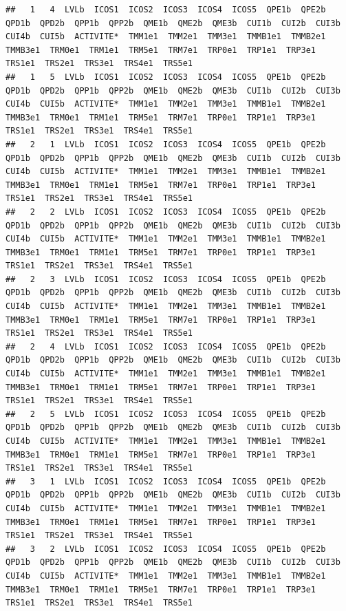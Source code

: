 \documentclass[11pt,a4paper, x11names]{article}\usepackage[]{graphicx}\usepackage[]{color}
\makeatletter
\newenvironment{kframe}{%
 \def\at@end@of@kframe{}%
 \ifinner\ifhmode%
  \def\at@end@of@kframe{\end{minipage}}%
  \begin{minipage}{\columnwidth}%
 \fi\fi%
 \def\FrameCommand##1{\hskip\@totalleftmargin \hskip-\fboxsep
 \colorbox{shadecolor}{##1}\hskip-\fboxsep
     \hskip-\linewidth \hskip-\@totalleftmargin \hskip\columnwidth}%
 \MakeFramed {\advance\hsize-\width
   \@totalleftmargin\z@ \linewidth\hsize
   \@setminipage}}%
 {\par\unskip\endMakeFramed%
 \at@end@of@kframe}
\newenvironment{knitrout}{}{} %
\makeatother
\begin{document}
\begin{knitrout}
\begin{kframe}
\begin{verbatim}
##   1   4  LVLb  ICOS1  ICOS2  ICOS3  ICOS4  ICOS5  QPE1b  QPE2b  QPD1b  QPD2b  QPP1b  QPP2b  QME1b  QME2b  QME3b  CUI1b  CUI2b  CUI3b  CUI4b  CUI5b  ACTIVITE*  TMM1e1  TMM2e1  TMM3e1  TMMB1e1  TMMB2e1  TMMB3e1  TRM0e1  TRM1e1  TRM5e1  TRM7e1  TRP0e1  TRP1e1  TRP3e1  TRS1e1  TRS2e1  TRS3e1  TRS4e1  TRS5e1
##   1   5  LVLb  ICOS1  ICOS2  ICOS3  ICOS4  ICOS5  QPE1b  QPE2b  QPD1b  QPD2b  QPP1b  QPP2b  QME1b  QME2b  QME3b  CUI1b  CUI2b  CUI3b  CUI4b  CUI5b  ACTIVITE*  TMM1e1  TMM2e1  TMM3e1  TMMB1e1  TMMB2e1  TMMB3e1  TRM0e1  TRM1e1  TRM5e1  TRM7e1  TRP0e1  TRP1e1  TRP3e1  TRS1e1  TRS2e1  TRS3e1  TRS4e1  TRS5e1
##   2   1  LVLb  ICOS1  ICOS2  ICOS3  ICOS4  ICOS5  QPE1b  QPE2b  QPD1b  QPD2b  QPP1b  QPP2b  QME1b  QME2b  QME3b  CUI1b  CUI2b  CUI3b  CUI4b  CUI5b  ACTIVITE*  TMM1e1  TMM2e1  TMM3e1  TMMB1e1  TMMB2e1  TMMB3e1  TRM0e1  TRM1e1  TRM5e1  TRM7e1  TRP0e1  TRP1e1  TRP3e1  TRS1e1  TRS2e1  TRS3e1  TRS4e1  TRS5e1
##   2   2  LVLb  ICOS1  ICOS2  ICOS3  ICOS4  ICOS5  QPE1b  QPE2b  QPD1b  QPD2b  QPP1b  QPP2b  QME1b  QME2b  QME3b  CUI1b  CUI2b  CUI3b  CUI4b  CUI5b  ACTIVITE*  TMM1e1  TMM2e1  TMM3e1  TMMB1e1  TMMB2e1  TMMB3e1  TRM0e1  TRM1e1  TRM5e1  TRM7e1  TRP0e1  TRP1e1  TRP3e1  TRS1e1  TRS2e1  TRS3e1  TRS4e1  TRS5e1
##   2   3  LVLb  ICOS1  ICOS2  ICOS3  ICOS4  ICOS5  QPE1b  QPE2b  QPD1b  QPD2b  QPP1b  QPP2b  QME1b  QME2b  QME3b  CUI1b  CUI2b  CUI3b  CUI4b  CUI5b  ACTIVITE*  TMM1e1  TMM2e1  TMM3e1  TMMB1e1  TMMB2e1  TMMB3e1  TRM0e1  TRM1e1  TRM5e1  TRM7e1  TRP0e1  TRP1e1  TRP3e1  TRS1e1  TRS2e1  TRS3e1  TRS4e1  TRS5e1
##   2   4  LVLb  ICOS1  ICOS2  ICOS3  ICOS4  ICOS5  QPE1b  QPE2b  QPD1b  QPD2b  QPP1b  QPP2b  QME1b  QME2b  QME3b  CUI1b  CUI2b  CUI3b  CUI4b  CUI5b  ACTIVITE*  TMM1e1  TMM2e1  TMM3e1  TMMB1e1  TMMB2e1  TMMB3e1  TRM0e1  TRM1e1  TRM5e1  TRM7e1  TRP0e1  TRP1e1  TRP3e1  TRS1e1  TRS2e1  TRS3e1  TRS4e1  TRS5e1
##   2   5  LVLb  ICOS1  ICOS2  ICOS3  ICOS4  ICOS5  QPE1b  QPE2b  QPD1b  QPD2b  QPP1b  QPP2b  QME1b  QME2b  QME3b  CUI1b  CUI2b  CUI3b  CUI4b  CUI5b  ACTIVITE*  TMM1e1  TMM2e1  TMM3e1  TMMB1e1  TMMB2e1  TMMB3e1  TRM0e1  TRM1e1  TRM5e1  TRM7e1  TRP0e1  TRP1e1  TRP3e1  TRS1e1  TRS2e1  TRS3e1  TRS4e1  TRS5e1
##   3   1  LVLb  ICOS1  ICOS2  ICOS3  ICOS4  ICOS5  QPE1b  QPE2b  QPD1b  QPD2b  QPP1b  QPP2b  QME1b  QME2b  QME3b  CUI1b  CUI2b  CUI3b  CUI4b  CUI5b  ACTIVITE*  TMM1e1  TMM2e1  TMM3e1  TMMB1e1  TMMB2e1  TMMB3e1  TRM0e1  TRM1e1  TRM5e1  TRM7e1  TRP0e1  TRP1e1  TRP3e1  TRS1e1  TRS2e1  TRS3e1  TRS4e1  TRS5e1
##   3   2  LVLb  ICOS1  ICOS2  ICOS3  ICOS4  ICOS5  QPE1b  QPE2b  QPD1b  QPD2b  QPP1b  QPP2b  QME1b  QME2b  QME3b  CUI1b  CUI2b  CUI3b  CUI4b  CUI5b  ACTIVITE*  TMM1e1  TMM2e1  TMM3e1  TMMB1e1  TMMB2e1  TMMB3e1  TRM0e1  TRM1e1  TRM5e1  TRM7e1  TRP0e1  TRP1e1  TRP3e1  TRS1e1  TRS2e1  TRS3e1  TRS4e1  TRS5e1

\end{verbatim}
\end{kframe}
\end{knitrout}
\end{document}
